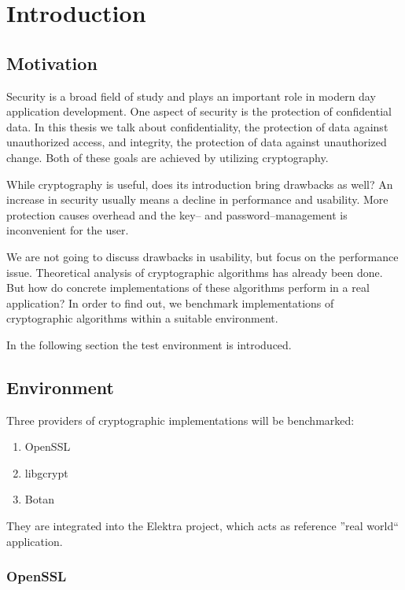 \chapter{Introduction}

\section{Motivation}

Security is a broad field of study and plays an important role in modern day application development.
One aspect of security is the protection of confidential data.
In this thesis we talk about confidentiality, the protection of data against unauthorized access, and integrity, the protection of data against unauthorized change.
Both of these goals are achieved by utilizing cryptography.

While cryptography is useful, does its introduction bring drawbacks as well?
An increase in security usually means a decline in performance and usability.
More protection causes overhead and the key-- and password--management is inconvenient for the user.

We are not going to discuss drawbacks in usability, but focus on the performance issue.
Theoretical analysis of cryptographic algorithms has already been done. 
But how do concrete implementations of these algorithms perform in a real application?
In order to find out, we benchmark implementations of cryptographic algorithms within a suitable environment.

In the following section the test environment is introduced.

\section{Environment}

Three providers of cryptographic implementations will be benchmarked:

\begin{enumerate}
\item OpenSSL
\item libgcrypt
\item Botan
\end{enumerate}

They are integrated into the Elektra project, which acts as reference ''real world`` application.

	\subsection{OpenSSL}

